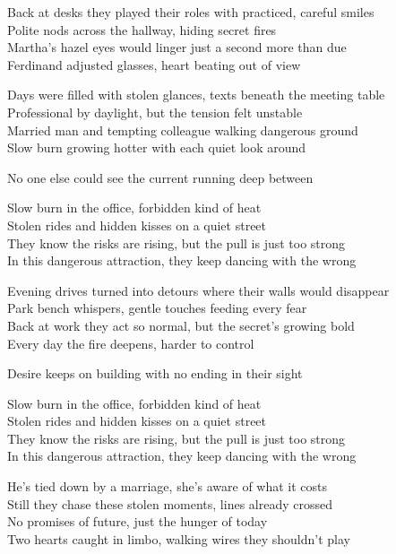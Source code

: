 \begin{lyrics}

Back at desks they played their roles with practiced, careful smiles\\
Polite nods across the hallway, hiding secret fires\\
Martha’s hazel eyes would linger just a second more than due\\
Ferdinand adjusted glasses, heart beating out of view

Days were filled with stolen glances, texts beneath the meeting table\\
Professional by daylight, but the tension felt unstable\\
Married man and tempting colleague walking dangerous ground\\
Slow burn growing hotter with each quiet look around

No one else could see the current running deep between

Slow burn in the office, forbidden kind of heat\\
Stolen rides and hidden kisses on a quiet street\\
They know the risks are rising, but the pull is just too strong\\
In this dangerous attraction, they keep dancing with the wrong

Evening drives turned into detours where their walls would disappear\\
Park bench whispers, gentle touches feeding every fear\\
Back at work they act so normal, but the secret’s growing bold\\
Every day the fire deepens, harder to control

Desire keeps on building with no ending in their sight

Slow burn in the office, forbidden kind of heat\\
Stolen rides and hidden kisses on a quiet street\\
They know the risks are rising, but the pull is just too strong\\
In this dangerous attraction, they keep dancing with the wrong

He’s tied down by a marriage, she’s aware of what it costs\\
Still they chase these stolen moments, lines already crossed\\
No promises of future, just the hunger of today\\
Two hearts caught in limbo, walking wires they shouldn’t play


\end{lyrics}
